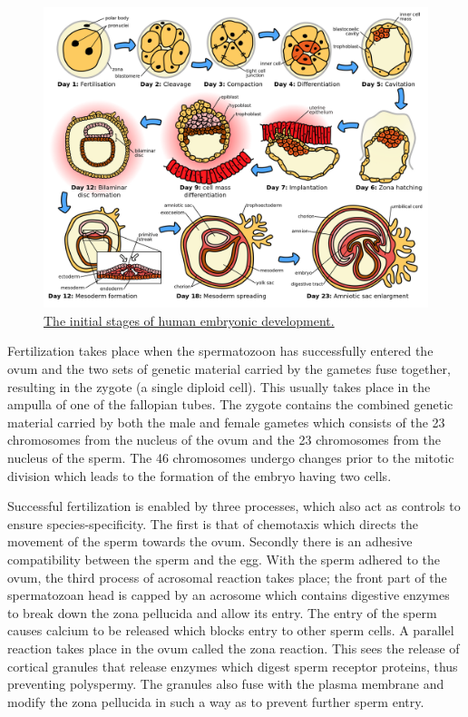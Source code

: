 \begin{figure}

{\centering \includegraphics[width=0.7\linewidth]{./figures/development/HumanEmbryogenesis} 

}

\caption{\href{https://commons.wikimedia.org/wiki/File:HumanEmbryogenesis.svg}{The initial stages of human embryonic development.}}\label{fig:humanembryonicdevelopment}
\end{figure}

Fertilization takes place when the spermatozoon has successfully entered the ovum and the two sets of genetic material carried by the gametes fuse together, resulting in the zygote (a single diploid cell). This usually takes place in the ampulla of one of the fallopian tubes. The zygote contains the combined genetic material carried by both the male and female gametes which consists of the 23 chromosomes from the nucleus of the ovum and the 23 chromosomes from the nucleus of the sperm. The 46 chromosomes undergo changes prior to the mitotic division which leads to the formation of the embryo having two cells.

Successful fertilization is enabled by three processes, which also act as controls to ensure species-specificity. The first is that of chemotaxis which directs the movement of the sperm towards the ovum. Secondly there is an adhesive compatibility between the sperm and the egg. With the sperm adhered to the ovum, the third process of acrosomal reaction takes place; the front part of the spermatozoan head is capped by an acrosome which contains digestive enzymes to break down the zona pellucida and allow its entry. The entry of the sperm causes calcium to be released which blocks entry to other sperm cells. A parallel reaction takes place in the ovum called the zona reaction. This sees the release of cortical granules that release enzymes which digest sperm receptor proteins, thus preventing polyspermy. The granules also fuse with the plasma membrane and modify the zona pellucida in such a way as to prevent further sperm entry.




